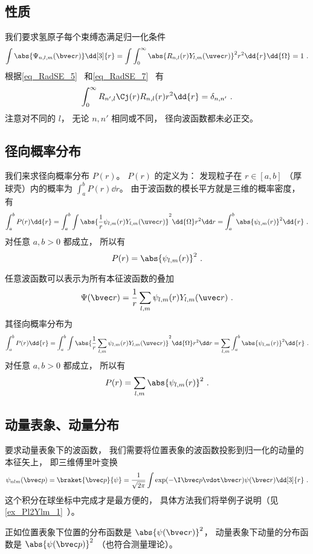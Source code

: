 \subsection{性质}
我们要求氢原子每个束缚态满足归一化条件
\begin{equation}
\int \abs{\Psi_{n,l,m}(\bvec r)} \dd[3]{r} = \int \int_0^\infty \abs{R_{n,l}(r) Y_{l,m}(\uvec r)}^2 r^2 \dd{r}\dd{\Omega} = 1~.
\end{equation}
根据\autoref{eq_RadSE_5}~ 和\autoref{eq_RadSE_7}~ 有
\begin{equation}
\int_0^\infty R_{n', l}\Cj(r) R_{n,l}(r) r^2 \dd{r} = \delta_{n,n'}~.
\end{equation}
注意对不同的 $l$， 无论 $n,n'$ 相同或不同， 径向波函数都未必正交。

\subsection{径向概率分布}
我们来求径向概率分布 $P(r)$。 $P(r)$ 的定义为： 发现粒子在 $r \in [a, b]$ （厚球壳）内的概率为 $\int_a^b P(r) \dd{r}$。 由于波函数的模长平方就是三维的概率密度， 有
\begin{equation}
\int_a^b P(r) \dd{r} = \int_a^b \int \abs{\frac1r \psi_{l,m}(r) Y_{l,m}(\uvec r)}^2 \dd{\Omega} r^2 \dd r
= \int_a^b \abs{\psi_{l,m}(r)}^2 \dd{r}~.
\end{equation}
对任意 $a, b > 0$ 都成立， 所以有
\begin{equation}
P(r) = \abs{\psi_{l,m}(r)}^2~.
\end{equation}

任意波函数可以表示为所有本征波函数的叠加
\begin{equation}
\Psi(\bvec r) = \frac1r \sum_{l,m} \psi_{l,m}(r) Y_{l,m}(\uvec r)~.
\end{equation}
其径向概率分布为
\begin{equation}\label{eq_HWF_4}
\int_a^b P(r) \dd{r} = \int_a^b \int \abs{\frac1r \sum_{l,m}\psi_{l,m}(r) Y_{l,m}(\uvec r)}^2 \dd{\Omega} r^2 \dd r
= \sum_{l,m} \int_a^b \abs{\psi_{l,m}(r)}^2 \dd{r}~.
\end{equation}
对任意 $a, b > 0$ 都成立， 所以有
\begin{equation}
P(r) = \sum_{l,m} \abs{\psi_{l,m}(r)}^2~.
\end{equation}

\subsection{动量表象、动量分布}
要求动量表象下的波函数， 我们需要将位置表象的波函数投影到归一化的动量的本征矢上， 即三维傅里叶变换
\begin{equation}
\psi_{nlm}(\bvec p) = \braket{\bvec p}{\psi} = \frac{1}{\sqrt{2\pi}} \int \exp(-\I \bvec p \vdot \bvec r) \psi(\bvec r) \dd[3]{r}~.
\end{equation}
这个积分在球坐标中完成才是最方便的， 具体方法我们将举例子说明（见\autoref{ex_Pl2Ylm_1}~）。

正如位置表象下位置的分布函数是 $\abs{\psi(\bvec r)}^2$， 动量表象下动量的分布函数是 $\abs{\psi(\bvec p)}^2$ （也符合测量理论）。
